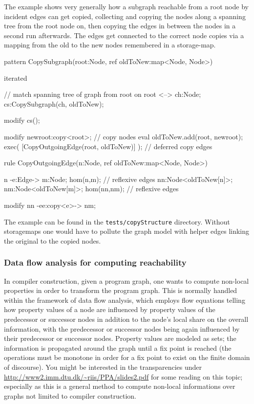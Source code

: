   \begin{example}
The example shows very generally how a subgraph reachable from a root node by incident edges can get copied, collecting and copying the nodes along a spanning tree from the root node on, then copying the edges in between the nodes in a second run afterwards. The edges get connected to the correct node copies via a mapping from the old to the new nodes remembered in a storage-map.
    \begin{grgen}
pattern CopySubgraph(root:Node, ref oldToNew:map<Node, Node>)
{
  iterated { // match spanning tree of graph from root on
    root <--> ch:Node;   	
    cs:CopySubgraph(ch, oldToNew);
    
    modify {
      cs();
    }
  }
  
  modify {
    newroot:copy<root>; // copy nodes
    eval { oldToNew.add(root, newroot); }
    exec( [CopyOutgoingEdge(root, oldToNew)] ); // deferred copy edges
  }
}

rule CopyOutgoingEdge(n:Node, ref oldToNew:map<Node, Node>)
{
  n -e:Edge-> m:Node;
  hom(n,m); // reflexive edges
  nn:Node<oldToNew[n]>; nm:Node<oldToNew[m]>;
  hom(nn,nm); // reflexive edges
    
  modify {
    nn -ee:copy<e>-> nm;
  }
}
    \end{grgen}
  \end{example}

The example can be found in the \texttt{tests/copyStructure} directory.
Without storagemaps one would have to pollute the graph model with helper edges linking the original to the copied nodes.

\subsubsection*{Data flow analysis for computing reachability}\label{subsub:flow}

In compiler construction, given a program graph, one wants to compute non-local properties in order to transform the program graph.
This is normally handled within the framework of data flow analysis, which employs flow equations telling how property values of a node are influenced by property values of the predecessor or successor nodes in addition to the node's local share on the overall information, with the predecessor or successor nodes being again influenced by their predecessor or successor nodes.
Property values are modeled as sets; the information is propagated around the graph until a fix point is reached (the operations must be monotone in order for a fix point to exist on the finite domain of discourse).
You might be interested in the transparencies under \url{http://www2.imm.dtu.dk/~riis/PPA/slides2.pdf} for some reading on this topic;
especially as this is a general method to compute non-local informations over graphs not limited to compiler construction.

